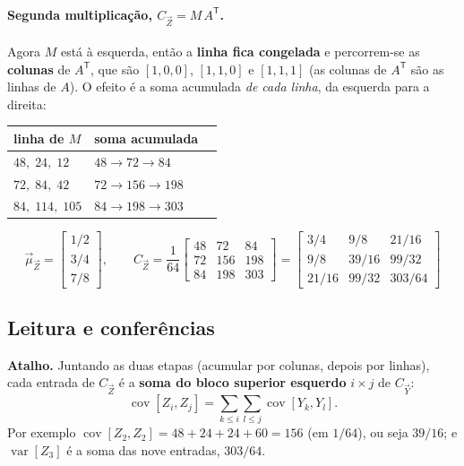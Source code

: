 \documentclass[11pt,a4paper]{article}
\DeclareMathOperator{\var}{var}
\DeclareMathOperator{\cov}{cov}
\begin{document}
\paragraph{Segunda multiplicação, $C_{\vec Z}=M\,A^{\mathsf T}$.} Agora $M$ está à
esquerda, então a \textbf{linha fica congelada} e percorrem-se as \textbf{colunas}
de $A^{\mathsf T}$, que são $[1,0,0]$, $[1,1,0]$ e $[1,1,1]$ (as colunas de
$A^{\mathsf T}$ são as linhas de $A$). O efeito é a soma acumulada \emph{de cada
linha}, da esquerda para a direita:

\begin{center}
\begin{tabular}{lll}
\toprule
linha de $M$ & soma acumulada & \\
\midrule
$48,\;24,\;12$ & $48 \to 72 \to 84$ & \\
$72,\;84,\;42$ & $72 \to 156 \to 198$ & \\
$84,\;114,\;105$ & $84 \to 198 \to 303$ & \\
\bottomrule
\end{tabular}
\end{center}

\begin{resp}
\[
\vec\mu_{\vec Z}=\begin{bmatrix}1/2\\3/4\\7/8\end{bmatrix},
\qquad
C_{\vec Z}=\frac1{64}\begin{bmatrix}48&72&84\\72&156&198\\84&198&303\end{bmatrix}
=\begin{bmatrix}
3/4 & 9/8 & 21/16\\[2pt]
9/8 & 39/16 & 99/32\\[2pt]
21/16 & 99/32 & 303/64
\end{bmatrix}
\]
\end{resp}

\subsection*{Leitura e conferências}

\textbf{Atalho.} Juntando as duas etapas (acumular por colunas, depois por linhas),
cada entrada de $C_{\vec Z}$ é a \textbf{soma do bloco superior esquerdo}
$i\times j$ de $C_{\vec Y}$:
\[
\cov[Z_i,Z_j]=\sum_{k\le i}\sum_{l\le j}\cov[Y_k,Y_l].
\]
Por exemplo $\cov[Z_2,Z_2]=48+24+24+60=156$ (em $1/64$), ou seja $39/16$; e
$\var[Z_3]$ é a soma das nove entradas, $303/64$.
\end{document}
